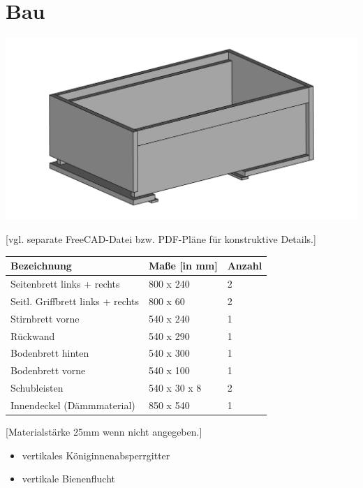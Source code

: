 \documentclass[12pt,a4paper,ngerman]{scrartcl}
\begin{document}
\section{Bau}

\includegraphics[width=\textwidth]{ansicht1}

[vgl. separate FreeCAD-Datei bzw. PDF-Pläne für konstruktive Details.]


\begin{center}
\begin{tabular}{lll}
  Bezeichnung &                       Maße [in mm] &          Anzahl \\
  \hline
  Seitenbrett links + rechts &        800 x 240 &             2 \\
  Seitl. Griffbrett links + rechts &  800 x 60 &              2 \\
  Stirnbrett vorne &                  540 x 240 &             1 \\
  Rückwand &                          540 x 290 &             1 \\
  Bodenbrett hinten &                 540 x 300 &             1 \\
  Bodenbrett vorne &                  540 x 100 &             1 \\
  Schubleisten &                      540 x 30 x 8 &          2 \\
  \hline
  Innendeckel (Dämmmaterial) &        850 x 540 &             1 \\
  \hline
\end{tabular}

[Materialstärke 25mm wenn nicht angegeben.]
\end{center}



\begin{itemize}
\item vertikales Königinnenabsperrgitter
\item vertikale Bienenflucht
\end{itemize}
\end{document}
